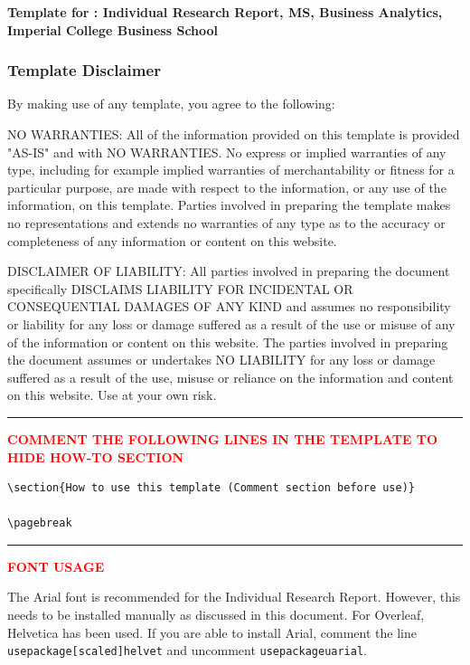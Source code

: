 
\textbf{Template for : Individual Research Report, MS, Business Analytics, Imperial College Business School
}
\subsubsection{Template Disclaimer}

By making use of any template, you agree to the following:

NO WARRANTIES: All of the information provided on this template is provided "AS-IS" and with NO WARRANTIES. No express or implied warranties of any type, including for example implied warranties of merchantability or fitness for a particular purpose, are made with respect to the information, or any use of the information, on this template. Parties involved in preparing the template makes no representations and extends no warranties of any type as to the accuracy or completeness of any information or content on this website.


DISCLAIMER OF LIABILITY: All parties involved in preparing the document specifically DISCLAIMS LIABILITY FOR INCIDENTAL OR CONSEQUENTIAL DAMAGES OF ANY KIND and assumes no responsibility or liability for any loss or damage suffered as a result of the use or misuse of any of the information or content on this website. The parties involved in preparing the document assumes or undertakes NO LIABILITY for any loss or damage suffered as a result of the use, misuse or reliance on the information and content on this website. Use at your own risk.

{\color{red} \rule{\linewidth}{0.5mm} }
\textcolor{red}{\textbf{COMMENT THE FOLLOWING LINES IN THE TEMPLATE TO HIDE HOW-TO SECTION}}
\begin{verbatim}
\section{How to use this template (Comment section before use)}

\pagebreak
\end{verbatim}
{\color{red} \rule{\linewidth}{0.5mm}}

\textcolor{red}{\textbf{FONT USAGE}}

The Arial font is recommended for the Individual Research Report. However, this needs to be installed manually as discussed in this document. For Overleaf, Helvetica has been used. If you are able to install Arial, comment the line \texttt{usepackage[scaled]{helvet}} and uncomment \texttt{usepackage{uarial}}.

